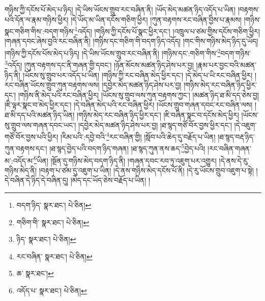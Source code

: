 གཉིས་ཀྱི་དངོས་པོ་མེད་པ་ཉིད། །དེ་ཡིས་ཡོངས་གྲུབ་རང་བཞིན་ནི། །ཡོད་མེད་མཚན་ཉིད་འདོད་པ་ཡིན། །བརྟགས་པའི་དོན་ལ་རྣམ་གཉིས་ཕྱིར། །དེ་ཡོད་མ་ཡིན་དངོས་གཅིག་ཕྱིར། །ཀུན་བརྟགས་རང་བཞིན་བྱིས་པ་རྣམས། །གཉིས་སྣང་གཅིག་གིས་:བདག་གཉིས་\footnote{བདག་ཉིད་  སྣར་ཐང་།  པེ་ཅིན། }འདོད། །གཉིས་ཀྱི་དངོས་པོ་སྣང་ཕྱིར་དང་། །འཁྲུལ་པ་ཙམ་གྱིས་དངོས་གཅིག་ཕྱིར། །གཞན་དབང་ཞེས་བྱའི་རང་བཞིན་ནི། །གཉིས་དང་གཅིག་གི་བདག་ཉིད་འདོད། །གང་གིས་གཉིས་མེད་ཉིད་དུ་ཡོད། །གཉིས་ཀྱི་དངོས་པོས་མེད་པ་ཉིད། །དེ་ཡིས་ཡོངས་གྲུབ་རང་བཞིན་ནི། །གཉིས་དང་:གཅིག་གིས་\footnote{གཅིག་གི་  སྣར་ཐང་།  པེ་ཅིན། }བདག་གཉིས་\footnote{ཉིད་  སྣར་ཐང་།  པེ་ཅིན། }འདོད། །ཀུན་བརྟགས་དང་ནི་གཞན་གྱི་དབང་། །ཉོན་མོངས་མཚན་ཉིད་ཤེས་པར་བྱ། །རྣམ་པར་བྱང་བའི་མཚན་ཉིད་ནི། །ཡོངས་སུ་གྲུབ་པར་འདོད་པ་ཡིན། །གཉིས་ཀྱི་རང་བཞིན་མེད་ཕྱིར་དང་། །དེ་མེད་པ་ཡི་རང་བཞིན་ཕྱིར། །རང་བཞིན་ཡོངས་གྲུབ་ཀུན་བརྟགས་ལས། །དབྱེར་མེད་མཚན་ཉིད་ཤེས་པར་བྱ། །གཉིས་མེད་རང་བཞིན་ཉིད་ཕྱིར་དང་། །གཉིས་ནི་མེད་པའི་རང་བཞིན་ཕྱིར། །ཡོངས་སུ་གྲུབ་ལས་ཀུན་བརྟགས་ཀྱང་། །མཚན་ཉིད་ཐ་མི་དད་ཅེས་བྱ། །ཇི་ལྟར་སྣང་བ་མེད་ཕྱིར་དང་། །དེ་བཞིན་མེད་པའི་རང་བཞིན་ཕྱིར། །ཡོངས་གྲུབ་གཞན་དབང་རང་བཞིན་ལས། །ཐ་མི་དད་པའི་མཚན་ཉིད་ཡིན། །གཉིས་མེད་རང་བཞིན་ཉིད་ཕྱིར་དང་། །ཇི་བཞིན་སྣང་བ་དངོས་མེད་ཕྱིར། །ཡོངས་སུ་གྲུབ་ལས་གཞན་དབང་ཡང་། །དབྱེར་མེད་མཚན་ཉིད་ཤེས་པར་བྱ། །ཐ་སྙད་གཙོ་བོར་བྱས་ཕྱིར་དང་། །དེ་འཇུག་གཙོ་བོར་བྱས་པའི་ཕྱིར། །རིམ་པའི་:དབྱེ་བའི་\footnote{རང་བཞིན་  སྣར་ཐང་།  པེ་ཅིན། }རང་བཞིན་གྱི། །སློབ་པའི་ཆེད་དུ་བརྗོད་པ་ཡིན། །ཐ་སྙད་བརྡ་ཉིད་ཀུན་བརྟགས་དང་། །ཐ་སྙད་བྱེད་པའི་བདག་ཉིད་གཞན། །ཐ་སྙད་ཀུན་ནས་ཆད་\footnote{ཆ་  སྣར་ཐང་། }བྱེད་པའི། །རང་བཞིན་གཞན་མ་:འདོད་མ་\footnote{འདོད་པ་  སྣར་ཐང་།  པེ་ཅིན། }ཡིན། །སྔོན་དུ་གཉིས་མེད་བདག་ཉིད་ནི། །གཞན་དབང་རབ་ཏུ་འཇུག་པར་འགྱུར། །དེ་ནས་དེ་རུ་གཉིས་མེད་ནི། །བརྟག་པ་ཙམ་དུ་འཇུག་པ་ཡིན། །དེ་ནས་གཉིས་མེད་དངོས་པོ་ནི། །དེ་རུ་ཡོངས་གྲུབ་འཇུག་པ་སྟེ། །དེ་བཞིན་དེ་ཉིད་དེ་བཞིན་དུ། །མེད་དང་ཡོད་ཅེས་བརྗོད་པ་ཡིན། །
